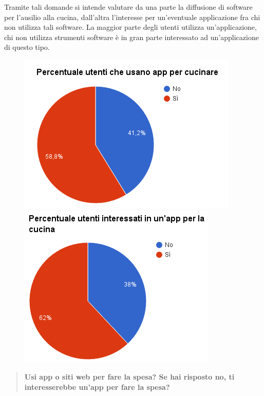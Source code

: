 Tramite tali domande si intende valutare da una parte la diffusione di software per l'ausilio alla cucina, dall'altra
l'interesse per un'eventuale applicazione fra chi non utilizza tali software. La maggior parte degli utenti utilizza un'applicazione,
chi non utilizza strumenti software è in gran parte interessato ad un'applicazione di questo tipo.

\begin{figure}[H]
\centering
\begin{minipage}{.48\textwidth}
	\includegraphics[scale=0.45]{img/chart_usi_app_cucina}
\end{minipage}
\hfill
\begin{minipage}{.49\textwidth}
	\includegraphics[scale=0.45]{img/chart_vorresti_app_cucina}
\end{minipage}
\end{figure}

\begin{quote}
	\textbf{Usi app o siti web per fare la spesa? Se hai risposto no, ti interesserebbe un'app per fare la spesa?}
\end{quote}


